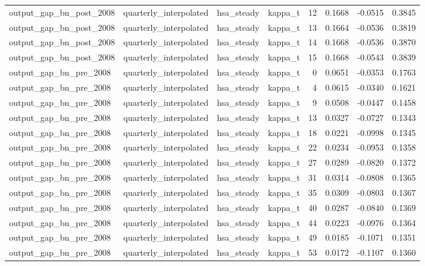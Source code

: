 \begin{tabular}{llllrrrr}
output\_gap\_bn\_post\_2008 & quarterly\_interpolated & hsa\_steady & kappa\_t & 12 & 0.1668 & -0.0515 & 0.3845 \\
output\_gap\_bn\_post\_2008 & quarterly\_interpolated & hsa\_steady & kappa\_t & 13 & 0.1664 & -0.0536 & 0.3819 \\
output\_gap\_bn\_post\_2008 & quarterly\_interpolated & hsa\_steady & kappa\_t & 14 & 0.1668 & -0.0536 & 0.3870 \\
output\_gap\_bn\_post\_2008 & quarterly\_interpolated & hsa\_steady & kappa\_t & 15 & 0.1668 & -0.0543 & 0.3839 \\
output\_gap\_bn\_pre\_2008 & quarterly\_interpolated & hsa\_steady & kappa\_t & 0 & 0.0651 & -0.0353 & 0.1763 \\
output\_gap\_bn\_pre\_2008 & quarterly\_interpolated & hsa\_steady & kappa\_t & 4 & 0.0615 & -0.0340 & 0.1621 \\
output\_gap\_bn\_pre\_2008 & quarterly\_interpolated & hsa\_steady & kappa\_t & 9 & 0.0508 & -0.0447 & 0.1458 \\
output\_gap\_bn\_pre\_2008 & quarterly\_interpolated & hsa\_steady & kappa\_t & 13 & 0.0327 & -0.0727 & 0.1343 \\
output\_gap\_bn\_pre\_2008 & quarterly\_interpolated & hsa\_steady & kappa\_t & 18 & 0.0221 & -0.0998 & 0.1345 \\
output\_gap\_bn\_pre\_2008 & quarterly\_interpolated & hsa\_steady & kappa\_t & 22 & 0.0234 & -0.0953 & 0.1358 \\
output\_gap\_bn\_pre\_2008 & quarterly\_interpolated & hsa\_steady & kappa\_t & 27 & 0.0289 & -0.0820 & 0.1372 \\
output\_gap\_bn\_pre\_2008 & quarterly\_interpolated & hsa\_steady & kappa\_t & 31 & 0.0314 & -0.0808 & 0.1365 \\
output\_gap\_bn\_pre\_2008 & quarterly\_interpolated & hsa\_steady & kappa\_t & 35 & 0.0309 & -0.0803 & 0.1367 \\
output\_gap\_bn\_pre\_2008 & quarterly\_interpolated & hsa\_steady & kappa\_t & 40 & 0.0287 & -0.0840 & 0.1369 \\
output\_gap\_bn\_pre\_2008 & quarterly\_interpolated & hsa\_steady & kappa\_t & 44 & 0.0223 & -0.0976 & 0.1364 \\
output\_gap\_bn\_pre\_2008 & quarterly\_interpolated & hsa\_steady & kappa\_t & 49 & 0.0185 & -0.1071 & 0.1351 \\
output\_gap\_bn\_pre\_2008 & quarterly\_interpolated & hsa\_steady & kappa\_t & 53 & 0.0172 & -0.1107 & 0.1360 \\

\end{tabular}
